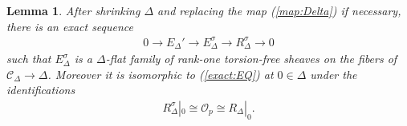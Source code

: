 \documentclass[11pt,oneside,a4paper,mathscr]{amsart}
\newtheorem{lemma}[thm]{Lemma}
\theoremstyle{definition}
\newcommand{\cC}{\mathcal{C}}
\begin{document}
\begin{lemma}\label{lem:sigma} After shrinking $\Delta$ and replacing the map (\ref{map:Delta}) if necessary, there is an exact sequence 
    \begin{align}\label{ext:sigma}
        0\to E_{\Delta}' \to E_{\Delta}^{\sigma} \to R_{\Delta}^{\sigma} \to 0
    \end{align}
    such that $E_{\Delta}^{\sigma}$ is a $\Delta$-flat family of rank-one torsion-free sheaves on the fibers of 
    $\cC_{\Delta}\to \Delta$. Moreover it is isomorphic to (\ref{exact:EQ}) at $0\in \Delta$ under the 
    identifications 
    \begin{align}\label{identify:sigma}R_{\Delta}^{\sigma}|_{0} \cong \mathcal{O}_{p} \cong 
    R_{\Delta}|_{0}.
\end{align}
\end{lemma}
\end{document}
